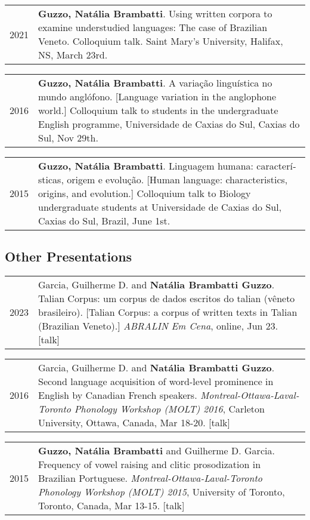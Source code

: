 \documentclass[letterpaper,10pt]{article}
\begin{document}
\begin{tabular}{p{1cm}p{16cm}}	
 2021 & \textbf{Guzzo, Nat\'alia Brambatti}. Using written corpora to examine understudied languages: The case of Brazilian Veneto. Colloquium talk. Saint Mary's University, Halifax, NS, March 23rd.
 \end{tabular}

 
\begin{tabular}{p{1cm}p{16cm}}	
 2016 & \textbf{Guzzo, Nat\'alia Brambatti}. A varia\c{c}\~ao lingu\'i­stica no mundo angl\'ofono. [Language variation in the anglophone world.] Colloquium talk to students in the undergraduate English programme, Universidade de Caxias do Sul, Caxias do Sul, Nov 29th.
 \end{tabular}
 
 
\begin{tabular}{p{1cm}p{16cm}}	
 2015 & \textbf{Guzzo, Nat\'alia Brambatti}. Linguagem humana: caracter\'i­sticas, origem e evolu\c{c}\~ao. [Human language: characteristics, origins, and evolution.] Colloquium talk to Biology undergraduate students at Universidade de Caxias do Sul, Caxias do Sul, Brazil, June 1st.
 \end{tabular}
 

\vspace{-0.2cm}

\subsection*{Other Presentations}


\begin{tabular}{p{1cm}p{16cm}}	
 2023 & Garcia, Guilherme D. and \textbf{Nat\'alia Brambatti Guzzo}. Talian Corpus: um corpus de dados escritos do talian (v\^eneto brasileiro). [Talian Corpus: a corpus of written texts in Talian (Brazilian Veneto).] \textit{ABRALIN Em Cena}, online, Jun 23. [talk]
\end{tabular}

\begin{tabular}{p{1cm}p{16cm}}	
 2016 & Garcia, Guilherme D. and \textbf{Nat\'alia Brambatti Guzzo}. Second language acquisition of word-level prominence in English by Canadian French speakers. \textit{Montreal-Ottawa-Laval-Toronto Phonology Workshop (MOLT) 2016}, Carleton University, Ottawa,  Canada, Mar 18-20. [talk] %
 \end{tabular}

\begin{tabular}{p{1cm}p{16cm}}	
 2015 & \textbf{Guzzo, Nat\'alia Brambatti} and Guilherme D. Garcia. Frequency of vowel raising and clitic prosodization in Brazilian Portuguese. \textit{Montreal-Ottawa-Laval-Toronto Phonology Workshop (MOLT) 2015}, University of Toronto, Toronto,  Canada, Mar 13-15. [talk] %
 \end{tabular}
 
\end{document}
